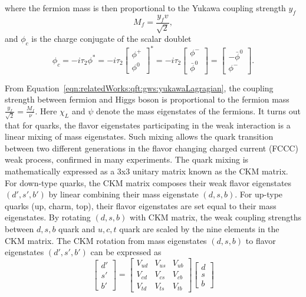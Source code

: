 \noindent where the fermion mass is then proportional to the Yukawa coupling strength $y_f$ 
\begin{equation}
    M_f =\frac{y_f v}{\sqrt{2}} ,  %
\end{equation}
\noindent and $\phi_c$ is the charge conjugate of the scalar doublet 
\begin{equation}
    \phi_c = -i\tau_2 \phi^* = -i\tau_2 \begin{bmatrix} \phi^+ \\ \phi^0 \end{bmatrix}^* = -i\tau_2 \begin{bmatrix} \phi^- \\ \bar{\phi}^0 \end{bmatrix} = \begin{bmatrix} - \bar{\phi}^0 \\ \phi^-   \end{bmatrix}.
\end{equation}


\noindent From Equation~\ref{eqn:relatedWorks:qft:gws:yukawaLagragian}, the coupling strength between fermion and Higgs boson  is proportional to the fermion mass $\frac{y_f}{\sqrt{2}} = \frac{M_f}{\nu}$. Here $\chi_L$ and $\psi$  denote the mass eigenstates of the fermions. It turns out that for quarks, the flavor eigenstates participating in the weak interaction is a linear mixing of mass eigenstates. Such mixing allows the quark transition between two different generations in the flavor changing charged current (FCCC) weak process, confirmed in many experiments. The quark mixing is mathematically expressed as a 3x3 unitary matrix known as the CKM matrix. For down-type quarks, the CKM matrix composes their weak flavor eigenstates $(d',s',b')$ by linear combining their mass eigenstate $(d,s,b)$. For up-type quarks (up, charm, top), their flavor eigenstates are set equal to their mass eigenstates. By rotating $(d,s,b)$ with CKM matrix, the weak coupling strengths between $d,s,b$ quark and $u,c,t$ quark are scaled by the nine elements in the CKM matrix. The CKM rotation from mass eigenstates $(d,s,b)$ to flavor eigenstates $(d',s',b')$ can be expressed as
\begin{equation}
    \begin{bmatrix}
        d' \\ s' \\ b' 
    \end{bmatrix} = 
     \begin{bmatrix}
        V_{ud} & V_{us} & V_{ub} \\ V_{cd} & V_{cs} & V_{cb} \\ V_{td} & V_{ts} & V_{tb}
    \end{bmatrix}   
    \begin{bmatrix}
        d \\ s \\ b
    \end{bmatrix}
\end{equation}

